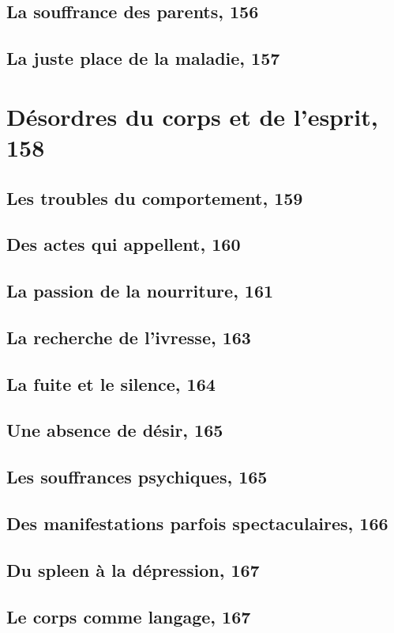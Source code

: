 \documentclass[12pt]{report}
\begin{document}
\begin{itemize}
\subsection{La souffrance des parents, 156}
\subsection{La juste place de la maladie, 157}
\section{Désordres du corps et de l'esprit, 158}
\subsection{Les troubles du comportement, 159}
\subsection{Des actes qui appellent, 160}
\subsection{La passion de la nourriture, 161}
\subsection{La recherche de l'ivresse, 163}
\subsection{La fuite et le silence, 164}
\subsection{Une absence de désir, 165}
\subsection{Les souffrances psychiques, 165}
\subsection{Des manifestations parfois spectaculaires, 166}
\subsection{Du spleen à la dépression, 167}
\subsection{Le corps comme langage, 167}

\end{itemize}
\end{document}
